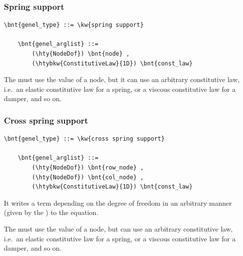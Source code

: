 \subsubsection{Spring support}
\label{sec:EL:GENEL:SPRING-SUPPORT}
\begin{Verbatim}[commandchars=\\\{\}]
    \bnt{genel_type} ::= \kw{spring support}

    \bnt{genel_arglist} ::=
        (\hty{NodeDof}) \bnt{node} ,
        (\htybkw{ConstitutiveLaw}{1D}) \bnt{const_law}
\end{Verbatim}
The  must use the  value of a 
 node, but it can use an arbitrary constitutive law,
i.e.\ an elastic constitutive law for a spring, or a viscous
constitutive law for a damper, and so on.

\subsubsection{Cross spring support}
\label{sec:EL:GENEL:CROSS-SPRING-SUPPORT}
\begin{Verbatim}[commandchars=\\\{\}]
    \bnt{genel_type} ::= \kw{cross spring support}

    \bnt{genel_arglist} ::=
        (\hty{NodeDof}) \bnt{row_node} ,
        (\hty{NodeDof}) \bnt{col_node} ,
        (\htybkw{ConstitutiveLaw}{1D}) \bnt{const_law}
\end{Verbatim}
It writes a term depending on the  degree of freedom in an
arbitrary manner (given by the ) to the 
 equation.

The  must use the  value
of a  node, but can use an arbitrary constitutive law,
i.e.\ an elastic constitutive law for a spring, or a viscous
constitutive law for a damper, and so on.

